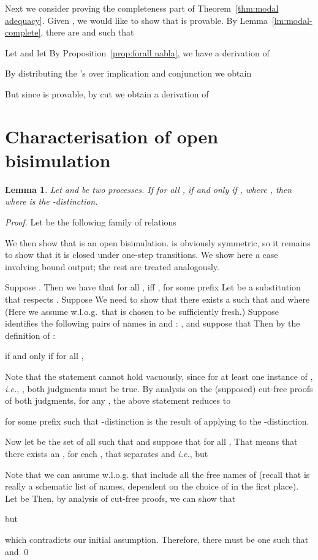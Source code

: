 \documentclass{acmtrans2m}
\newtheorem{lemma}[theorem]{Lemma}
\newcommand{\ie}{{\em i.e.}}
\begin{document}
Next we consider proving the completeness part of Theorem~\ref{thm:modal adequacy}.
Given , we would like to show that 
 is provable.
By Lemma~\ref{lm:modal-complete}, there are  and  such that
 
Let  and let 
By Proposition~\ref{prop:forall nabla}, we have a derivation of 

By distributing the 's over implication and conjunction we obtain

But since  is provable, by cut we obtain
a derivation of 



\section{Characterisation of open bisimulation}

\begin{lemma}
\label{lm:ch-open-sound}
Let  and  be two processes. 
If for all , 
 if and only if , where , 
then  where  is the -distinction.
\end{lemma}
\begin{proof}
Let  be the following family of relations 

We then show that  is an open bisimulation.  is obviously symmetric, so it remains
to show that it is closed under one-step transitions. 
We show here a case involving bound output; 
the rest are treated analogously.

Suppose . Then we have that for all , 
 iff ,
for some prefix 
Let  be a substitution that respects . Suppose 
 We need to show that there exists a 
such that  and 
where  (Here we
assume w.l.o.g.\ that 
 is chosen to be sufficiently fresh.)
Suppose  identifies the following pairs of names in  and :
, and suppose that 
Then by the definition of :

if and only if for all ,



Note that the statement cannot hold vacuously, since for at least
one instance of , \ie, , both judgments must be true.
By analysis on the (supposed) cut-free proofs of both judgments, for any , 
the above statement reduces to

for some prefix  such that -distinction
is the result of applying  to the -distinction.

Now let  be the set of all  such that
 and suppose that for all ,
 That means that there exists an 
, for each , that separates  and 
\ie,  but

Note that we can assume w.l.o.g. that  include all the free names
of  (recall that  is really a schematic list of names,
dependent on the choice of  in the first place). 
Let  be 
Then, by analysis of cut-free proofs, we can show that 

but

which contradicts our initial assumption.
Therefore, there must be one  such that
 and 
\qed
\end{proof}
\end{document}
